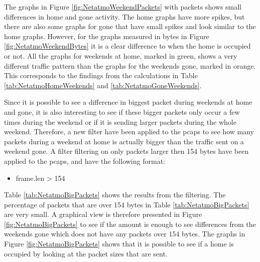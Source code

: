 The graphs in Figure \ref{fig:NetatmoWeekendPackets} with packets shows small differences in home and gone activity. The home graphs have more spikes, but there are also some graphs for gone that have small spikes and look similar to the home graphs. However, for the graphs measured in bytes in Figure \ref{fig:NetatmoWeekendBytes} it is a clear difference to when the home is occupied or not. All the graphs for weekends at home, marked in green, shows a very different traffic pattern than the graphs for the weekends gone, marked in orange. This corresponds to the findings from the calculations in Table \ref{tab:NetatmoHomeWeekends} and \ref{tab:NetatmoGoneWeekends}.

Since it is possible to see a difference in biggest packet during weekends at home and gone, it is also interesting to see if these bigger packets only occur a few times during the weekend or if it is sending larger packets during the whole weekend. Therefore, a new filter have been applied to the pcaps to see how many packets during a weekend at home is actually bigger than the traffic sent on a weekend gone. A filter filtering on only packets larger then 154 bytes have been applied to the pcaps, and have the following format:

\begin{itemize}
    \item frame.len > 154
\end{itemize}

Table \ref{tab:NetatmoBigPackets} shows the results from the filtering. The percentage of packets that are over 154 bytes in Table \ref{tab:NetatmoBigPackets} are very small. A graphical view is therefore presented in Figure \ref{fig:NetatmoBigPackets} to see if the amount is enough to see differences from the weekends gone which does not have any packets over 154 bytes. The graphs in Figure \ref{fig:NetatmoBigPackets} shows that it is possible to see if a home is occupied by looking at the packet sizes that are sent. 

